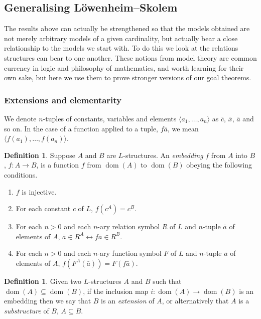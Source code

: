\documentclass[10pt, a4paper, oneside]{article}
\theoremstyle{definition}
\newtheorem{dfn}[thm]{Definition}
\theoremstyle{remark}
\theoremstyle{plain}
\theoremstyle{plain}
\DeclareMathOperator{\dom}{dom}
\begin{document}
\subsection{Generalising Löwenheim--Skolem}

The results above can actually be strengthened so that the models obtained are
not merely arbitrary models of a given cardinality, but actually bear a close
relationship to the models we start with. To do this we look at the relations
structures can bear to one another. These notions from model theory are common
currency in logic and philosophy of mathematics, and worth learning for their
own sake, but here we use them to prove stronger versions of our goal theorems.

\subsubsection{Extensions and elementarity}

We denote $n$-tuples of constants, variables and elements $\langle a_1, \dotsc,
a_n \rangle$ as $\bar{c}$, $\bar{x}$, $\bar{a}$ and so on. In the case of a
function applied to a tuple, $f\bar{a}$, we mean $\langle f(a_1), \dotsc, f(a_n)
\rangle$.

\begin{dfn}
    Suppose $A$ and $B$ are $L$-structures. An \emph{embedding} $f$ from $A$
    into $B$, $f : A \rightarrow B$, is a function $f$ from $\dom(A)$ to
    $\dom(B)$ obeying the following conditions.
    
    \begin{enumerate}
        \item $f$ is injective.
        \item For each constant $c$ of $L$, $f(c^A) = c^B$.
        \item For each $n > 0$ and each $n$-ary relation symbol $R$ of $L$ and
              $n$-tuple $\bar{a}$ of elements of $A$, $\bar{a} \in R^A
              \leftrightarrow f\bar{a} \in R^B$.
        \item For each $n > 0$ and each $n$-ary function symbol $F$ of $L$ and
              $n$-tuple $\bar{a}$ of elements of $A$, $f(F^A(\bar{a})) =
              F(f\bar{a})$.
    \end{enumerate}
\end{dfn}

\begin{dfn}
    Given two $L$-structures $A$ and $B$ such that $\dom(A) \subseteq \dom(B)$,
    if the inclusion map $i : \dom(A) \rightarrow \dom(B)$ is an embedding then
    we say that $B$ is an \emph{extension} of $A$, or alternatively that $A$ is
    a \emph{substructure} of $B$, $A \subseteq B$.
\end{dfn}
\end{document}
